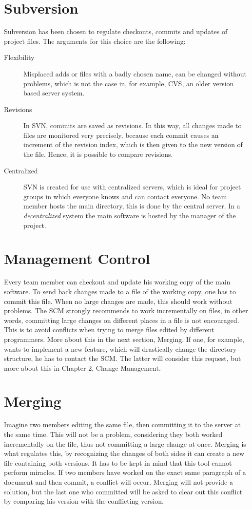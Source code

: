 \documentclass{report}
\begin{document}
\section{Subversion}
Subversion has been chosen to regulate checkouts, commits and updates of project files.
The arguments for this choice are the following:
\begin{description}
\item[Flexibility]
Misplaced adds or files with a badly chosen name, can be changed without problems, which is not the case in, for example, CVS, an older version based server system.
\item[Revisions]
In SVN, commits are saved as revisions.
In this way, all changes made to files are monitored very precisely, because each commit causes an increment of the revision index, which is then given to the new version of the file.
Hence, it is possible to compare revisions.
\item[Centralized]
SVN is created for use with centralized servers, which is ideal for project groups in which everyone knows and can contact everyone.
No team member hosts the main directory, this is done by the central server.
In a {\it decentralized} system the main software is hosted by the manager of the project.
\end{description}
\section{Management Control}
Every team member can checkout and update his working copy of the main software.
To send back changes made to a file of the working copy, one has to commit this file.
When no large changes are made, this should work without problems.
The SCM strongly recommends to work incrementally on files, in other words, committing large changes on different places in a file is not encouraged.
This is to avoid conflicts when trying to merge files edited by different programmers. More about this in the next section, Merging.
If one, for example, wants to implement a new feature, which will drastically change the directory structure, he has to contact the SCM.
The latter will consider this request, but more about this in Chapter 2, Change Management.
\section{Merging}
Imagine two members editing the same file, then committing it to the server at the same time.
This will not be a problem, considering they both worked incrementally on the file, thus not committing a large change at once.
Merging is what regulates this, by recognizing the changes of both sides it can create a new file containing both versions.
It has to be kept in mind that this tool cannot perform miracles.
If two members have worked on the exact same paragraph of a document and then commit, a conflict will occur.
Merging will not provide a solution, but the last one who committed will be asked to clear out this conflict by comparing his version with the conflicting version.
\end{document}
